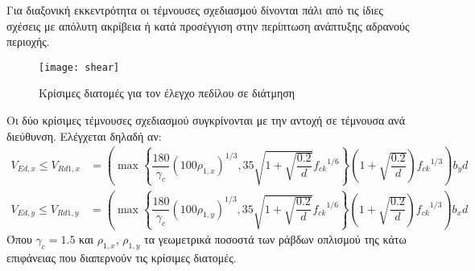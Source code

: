 \noindent
Για διαξονική εκκεντρότητα οι τέμνουσες σχεδιασμού δίνονται πάλι από τις ίδιες σχέσεις με απόλυτη ακρίβεια ή κατά προσέγγιση στην περίπτωση ανάπτυξης αδρανούς περιοχής.

\begin{figure}[H]
  \centering
  \texttt{[image: shear]}
  \caption{Κρίσιμες διατομές για τον έλεγχο πεδίλου σε διάτμηση}
  \label{fig:shear}
\end{figure}

Οι δύο κρίσιμες τέμνουσες σχεδιασμού συγκρίνονται με την αντοχή σε τέμνουσα ανά διεύθυνση. Ελέγχεται δηλαδή αν:
\begin{subequations}
\begin{align}
  V_{Ed,x} \leq V_{Rd1,x} & = \left(\max\left\{\dfrac{180}{{\gamma}_c}\left(100{\rho}_{1,x}\right)^{1/3}, 35\sqrt{1 + \sqrt{\dfrac{0.2}{d}}}{f_{ck}}^{1/6}\right\}\left(1 + \sqrt{\dfrac{0.2}{d}}\right){f_{ck}}^{1/3}\right){b_y}d\label{eqn:27a}\\[5pt]
  V_{Ed,y} \leq V_{Rd1,y} & = \left(\max\left\{\dfrac{180}{{\gamma}_c}\left(100{\rho}_{1,y}\right)^{1/3}, 35\sqrt{1 + \sqrt{\dfrac{0.2}{d}}}{f_{ck}}^{1/6}\right\}\left(1 + \sqrt{\dfrac{0.2}{d}}\right){f_{ck}}^{1/3}\right){b_x}d\label{eqn:27b}
\end{align}
\end{subequations}
\noindent
Όπου ${\gamma}_c = 1.5$ και ${\rho}_{1,x}$, ${\rho}_{1,y}$ τα γεωμετρικά ποσοστά των ράβδων οπλισμού της κάτω επιφάνειας που διαπερνούν τις κρίσιμες διατομές.

